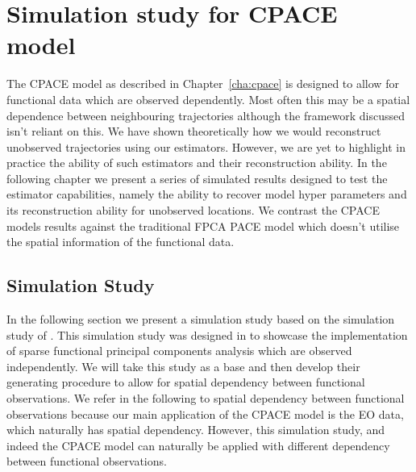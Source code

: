 
\chapter{Simulation study for  CPACE model \label{cha:application}}  %

\ifpdf
    \graphicspath{{Chapter6/Figs/Raster/}{Chapter6/Figs/PDF/}{Chapter6/Figs/}}
\else
    \graphicspath{{Chapter6/Figs/Vector/}{Chapter6/Figs/}}
\fi
The CPACE model as described in Chapter~\ref{cha:cpace} is designed to allow for functional data which are observed dependently.
Most often this may be a spatial dependence between neighbouring trajectories although the framework discussed isn't reliant on this.
We have shown theoretically how we would reconstruct unobserved trajectories using our estimators. 
However, we are yet to highlight in practice the ability of such estimators and their reconstruction ability.
In the following chapter we present a series of simulated results designed to test the estimator capabilities, namely the ability to recover model hyper parameters and its reconstruction ability for unobserved locations.
We contrast the CPACE models results against the traditional FPCA PACE model which doesn't utilise the spatial information of the functional data.

\section{Simulation Study \label{sec:sim_study}}
In the following section we present a simulation study based on the simulation study of \cite{yao_functional_2005}.
This simulation study was designed in \cite{yao_functional_2005} to showcase the implementation of sparse functional principal components analysis which are observed independently.
We will take this study as a base and then develop their generating procedure to allow for spatial dependency between functional observations.
We refer in the following to spatial dependency between functional observations because our main application of the CPACE model is the EO data, which naturally has spatial dependency.
However, this simulation study, and indeed the CPACE model can naturally be applied with different dependency between functional observations.

